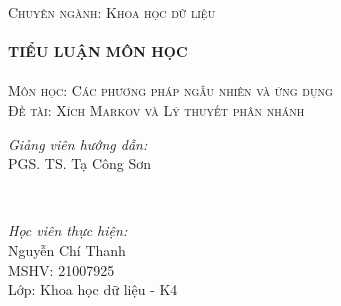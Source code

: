 \documentclass[14pt, a4paper]{article}
\numberwithin{equation}{section}
\numberwithin{figure}{section}
\theoremstyle{sltheorem}
\theoremstyle{soltheorem}
\numberwithin{dl}{section}
\numberwithin{vd}{section}
\begin{document}
\begin{titlepage}
        \textsc{\Large Chuyên ngành: Khoa học dữ liệu}\\[0.5cm] %



        \HRule \\[0.4cm]
        { \huge \bfseries TIỂU LUẬN MÔN HỌC}\\[0.4cm] %
        \HRule \\[1.5cm]

        \textsc{\Large Môn học: Các phương pháp ngẫu nhiên và ứng dụng}\\[1cm] %


        \textsc{\Large Đề tài: Xích Markov và Lý thuyết phân nhánh}\\[2cm]


        \begin{minipage}{0.4\textwidth}
            \begin{flushleft} \large
            \emph{Giảng viên hướng dẫn:} \\
            PGS. TS. Tạ Công Sơn %
            \end{flushleft}
        \end{minipage}\\[0.5cm]

        \begin{minipage}{0.4\textwidth}
        \begin{flushleft} \large
        \emph{Học viên thực hiện:}\\
        Nguyễn Chí Thanh \\
        MSHV: 21007925 \\ %
        Lớp: Khoa học dữ liệu - K4
        \end{flushleft}
        \end{minipage}




\end{titlepage}
\end{document}
